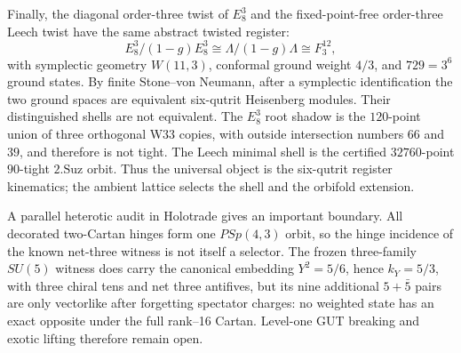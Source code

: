 Finally, the diagonal order-three twist of $E_8^3$ and the fixed-point-free order-three Leech twist have the same abstract twisted register:
\[
 E_8^3/(1-g)E_8^3\cong\Lambda/(1-g)\Lambda\cong F_3^{12},
\]
with symplectic geometry $W(11,3)$, conformal ground weight $4/3$, and $729=3^6$ ground states.  By finite Stone--von Neumann, after a symplectic identification the two ground spaces are equivalent six-qutrit Heisenberg modules.  Their distinguished shells are not equivalent.  The $E_8^3$ root shadow is the $120$-point union of three orthogonal W33 copies, with outside intersection numbers $66$ and $39$, and therefore is not tight.  The Leech minimal shell is the certified $32760$-point $90$-tight $2.\mathrm{Suz}$ orbit.  Thus the universal object is the six-qutrit register kinematics; the ambient lattice selects the shell and the orbifold extension.

A parallel heterotic audit in Holotrade gives an important boundary.  All decorated two-Cartan hinges form one $PSp(4,3)$ orbit, so the hinge incidence of the known net-three witness is not itself a selector.  The frozen three-family $SU(5)$ witness does carry the canonical embedding $Y^2=5/6$, hence $k_Y=5/3$, with three chiral tens and net three antifives, but its nine additional $5+\bar5$ pairs are only vectorlike after forgetting spectator charges: no weighted state has an exact opposite under the full rank--16 Cartan.  Level-one GUT breaking and exotic lifting therefore remain open.
